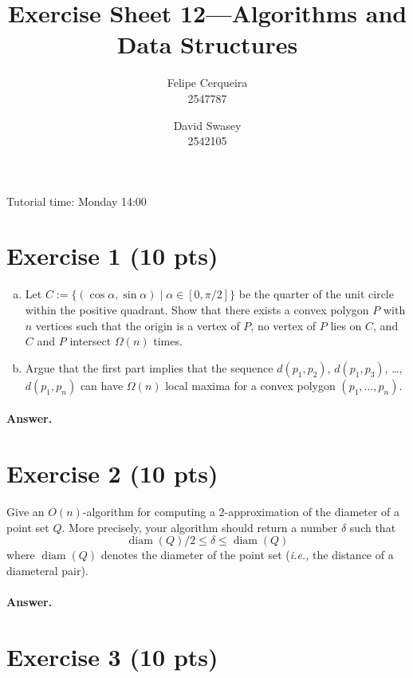 \documentclass[a4paper]{article}
\title{Exercise Sheet 12---Algorithms and Data Structures}
\author{Felipe Cerqueira \\ 2547787 \and David Swasey \\ 2542105}
\newcommand{\ie}{\emph{i.e.,} }
\DeclareMathOperator{\diam}{diam}
\begin{document}
\maketitle

Tutorial time: Monday 14:00


\section*{Exercise 1 (10 pts)}

\begin{enumerate}[a)]

\item Let $C := \{ (\cos \alpha, \sin \alpha) \mid \alpha \in [0, \pi/2] \}$ be the quarter of the unit circle within the positive quadrant.
Show that there exists a convex polygon $P$ with $n$ vertices such that the origin is a vertex of $P$, no vertex of $P$ lies on $C$, and $C$ and $P$ intersect $\Omega(n)$ times.

\item Argue that the first part implies that the sequence $d(p_1, p_2)$, $d(p_1, p_3)$, \ldots, $d(p_1, p_n)$ can have $\Omega(n)$ local maxima for a convex polygon $(p_1, \ldots, p_n)$.

\end{enumerate}

\paragraph{Answer.}


\section*{Exercise 2 (10 pts)}

Give an $O(n)$-algorithm for computing a 2-approximation of the diameter of a point set $Q$.
More precisely, your algorithm should return a number $\delta$ such that
\[
	\diam(Q)/2 \le \delta \le \diam(Q)
\]
where $\diam(Q)$ denotes the diameter of the point set (\ie the distance of a diameteral pair).

\paragraph{Answer.}


\section*{Exercise 3 (10 pts)}
\end{document}
